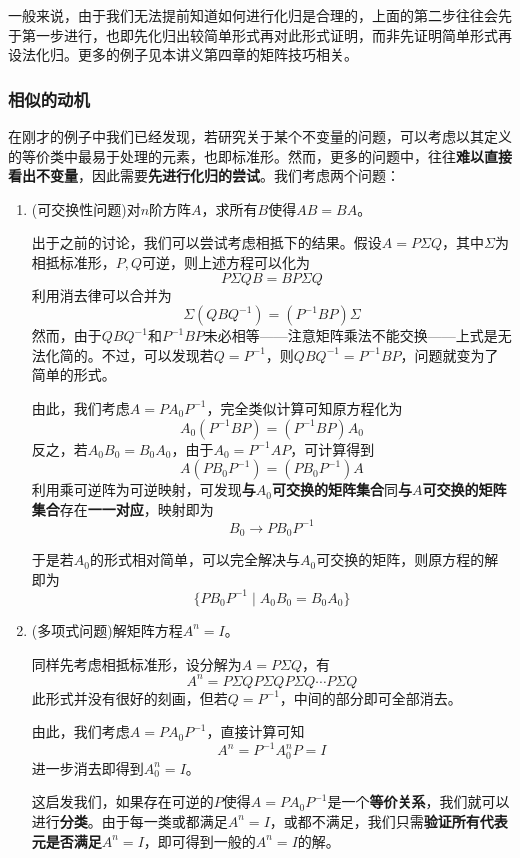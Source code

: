 \documentclass[a4paper,UTF8,fontset=windows]{ctexart}
\newcommand*{\note}{\noindent *}
\begin{document}
\note 一般来说，由于我们无法提前知道如何进行化归是合理的，上面的第二步往往会先于第一步进行，也即先化归出较简单形式再对此形式证明，而非先证明简单形式再设法化归。更多的例子见本讲义第四章的矩阵技巧相关。

\subsubsection{相似的动机}
在刚才的例子中我们已经发现，若研究关于某个不变量的问题，可以考虑以其定义的等价类中最易于处理的元素，也即标准形。然而，更多的问题中，往往\textbf{难以直接看出不变量}，因此需要\textbf{先进行化归的尝试}。我们考虑两个问题：

\begin{enumerate}
    \item (可交换性问题)对$n$阶方阵$A$，求所有$B$使得$AB=BA$。
    
    出于之前的讨论，我们可以尝试考虑相抵下的结果。假设$A=P\Sigma Q$，其中$\Sigma$为相抵标准形，$P,Q$可逆，则上述方程可以化为
    $$P\Sigma QB=BP\Sigma Q$$
    利用消去律可以合并为
    $$\Sigma(QBQ^{-1})=(P^{-1}BP)\Sigma$$
    然而，由于$QBQ^{-1}$和$P^{-1}BP$未必相等——注意矩阵乘法不能交换——上式是无法化简的。不过，可以发现若$Q=P^{-1}$，则$QBQ^{-1}=P^{-1}BP$，问题就变为了简单的形式。

    由此，我们考虑$A=PA_0P^{-1}$，完全类似计算可知原方程化为
    $$A_0(P^{-1}BP)=(P^{-1}BP)A_0$$
    反之，若$A_0B_0=B_0A_0$，由于$A_0=P^{-1}AP$，可计算得到
    $$A(PB_0P^{-1})=(PB_0P^{-1})A$$
    利用乘可逆阵为可逆映射，可发现\textbf{与$A_0$可交换的矩阵集合}同\textbf{与$A$可交换的矩阵集合}存在\textbf{一一对应}，映射即为
    $$B_0\to PB_0P^{-1}$$

    于是若$A_0$的形式相对简单，可以完全解决与$A_0$可交换的矩阵，则原方程的解即为
    $$\{PB_0P^{-1}\mid A_0B_0=B_0A_0\}$$
    
    \item (多项式问题)解矩阵方程$A^n=I$。
    
    同样先考虑相抵标准形，设分解为$A=P\Sigma Q$，有
    $$A^n=P\Sigma QP\Sigma QP\Sigma Q\cdots P\Sigma Q$$
    此形式并没有很好的刻画，但若$Q=P^{-1}$，中间的部分即可全部消去。

    由此，我们考虑$A=PA_0P^{-1}$，直接计算可知
    $$A^n=P^{-1}A_0^nP=I$$
    进一步消去即得到$A_0^n=I$。

    这启发我们，如果存在可逆的$P$使得$A=PA_0P^{-1}$是一个\textbf{等价关系}，我们就可以进行\textbf{分类}。由于每一类或都满足$A^n=I$，或都不满足，我们只需\textbf{验证所有代表元是否满足}$A^n=I$，即可得到一般的$A^n=I$的解。
\end{enumerate}
\end{document}
